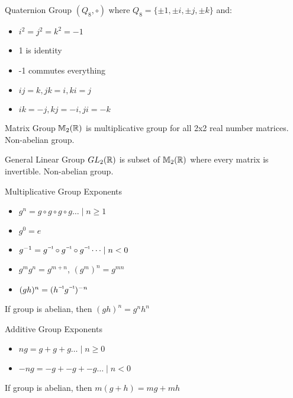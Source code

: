 \begin{flashcard}[Definition]{Quaternion Group}
  $(Q_8, \circ)$ where $Q_8 = \{\pm 1, \pm i, \pm j, \pm k\}$ and:
  \begin{itemize}
    \item $i^2 = j^2 = k^2 = -1$
    \item 1 is identity
    \item -1 commutes everything
    \item $ij = k, jk = i, ki = j$
    \item $ik = -j, kj = -i, ji = -k$
  \end{itemize}
\end{flashcard}

\begin{flashcard}[Definition]{Matrix Group}
  $\mathbb{M}_2(\mathbb{R})$ is multiplicative group for all 2x2 real number matrices.
  \vfill
  Non-abelian group.
\end{flashcard}

\begin{flashcard}[Definition]{General Linear Group}
  $GL_2(\mathbb{R})$ is subset of $\mathbb{M}_2(\mathbb{R})$ where every matrix is invertible.
  \vfill
  Non-abelian group.
\end{flashcard}

\begin{flashcard}[Definition]{Multiplicative Group Exponents}
  \begin{itemize}
    \item $g^n = g \circ g \circ g \circ g \dots \mid n \geq 1$
    \item $g^0 = e$
    \item $g^{-1} = \inv{g} \circ \inv{g} \circ \inv{g} \dots \mid n < 0$
    \item $g^mg^n = g^{m+n}$, $(g^m)^n = g^{mn}$
    \item $(gh)^n = (\inv{h}\inv{g})^{-n}$
  \end{itemize}
  \vfill
  If group is abelian, then $(gh)^n = g^nh^n$
\end{flashcard}

\begin{flashcard}[Definition]{Additive Group Exponents}
  \begin{itemize}
    \item $ng = g + g + g \dots \mid n \geq 0$
    \item $-ng = -g + -g + -g \dots \mid n < 0$
  \end{itemize}
  \vfill
  If group is abelian, then $m(g + h) = mg + mh$
\end{flashcard}


